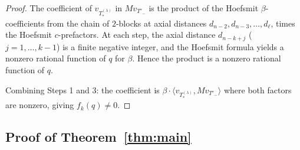 \documentclass[11pt]{article}
\theoremstyle{definition}
\begin{document}
\begin{proof}
The coefficient of $v_{T_{*}^{(\lambda)}}$ in $M v_{T'_-}$ is the
product of the Hoefsmit $\beta$-coefficients from the chain of
$2$-blocks at axial distances $d_{n-2}, d_{n-3}, \ldots, d_\ell$,
times the Hoefsmit $c$-prefactors.  At each step, the axial distance
$d_{n-k+j}$ ($j = 1, \ldots, k-1$) is a finite negative integer, and
the Hoefsmit formula yields a nonzero rational function of $q$ for
$\beta$.  Hence the product is a nonzero rational function of $q$.

Combining Steps 1 and 3: the coefficient is $\beta \cdot
\langle v_{T_{*}^{(\lambda)}}, M v_{T'_-}\rangle$ where both factors
are nonzero, giving $f_k(q) \ne 0$.
\end{proof}

\subsection{Proof of Theorem~\ref{thm:main}}
\end{document}
